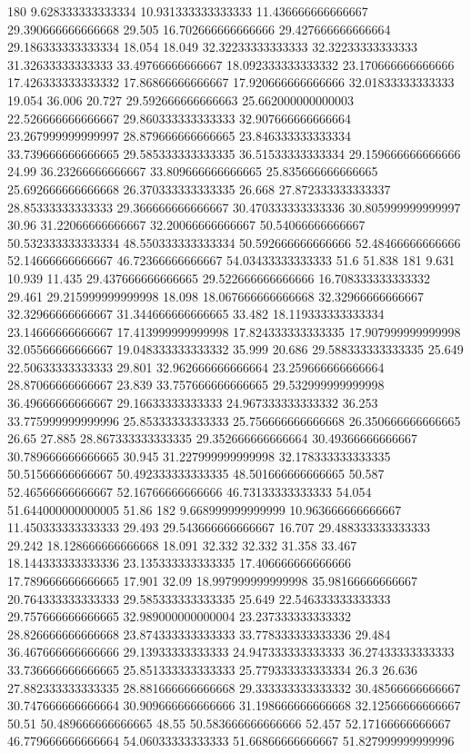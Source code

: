 180 9.628333333333334 10.931333333333333 11.436666666666667 29.390666666666668 29.505 16.702666666666666 29.427666666666664 29.186333333333334 18.054 18.049 32.32233333333333 32.32233333333333 31.32633333333333 33.49766666666667 18.092333333333332 23.170666666666666 17.426333333333332 17.86866666666667 17.920666666666666 32.01833333333333 19.054 36.006 20.727 29.592666666666663 25.662000000000003 22.526666666666667 29.860333333333333 32.907666666666664 23.267999999999997 28.879666666666665 23.846333333333334 33.739666666666665 29.585333333333335 36.51533333333334 29.159666666666666 24.99 36.23266666666667 33.809666666666665 25.835666666666665 25.692666666666668 26.370333333333335 26.668 27.872333333333337 28.85333333333333 29.366666666666667 30.470333333333336 30.805999999999997 30.96 31.22066666666667 32.20066666666667 50.54066666666667 50.532333333333334 48.550333333333334 50.592666666666666 52.48466666666666 52.14666666666667 46.72366666666667 54.03433333333333 51.6 51.838
181 9.631 10.939 11.435 29.437666666666665 29.522666666666666 16.708333333333332 29.461 29.215999999999998 18.098 18.067666666666668 32.32966666666667 32.32966666666667 31.344666666666665 33.482 18.119333333333334 23.14666666666667 17.413999999999998 17.824333333333335 17.907999999999998 32.05566666666667 19.048333333333332 35.999 20.686 29.588333333333335 25.649 22.50633333333333 29.801 32.962666666666664 23.259666666666664 28.87066666666667 23.839 33.757666666666665 29.532999999999998 36.49666666666667 29.16633333333333 24.967333333333332 36.253 33.775999999999996 25.85333333333333 25.756666666666668 26.350666666666665 26.65 27.885 28.867333333333335 29.352666666666664 30.49366666666667 30.789666666666665 30.945 31.227999999999998 32.178333333333335 50.51566666666667 50.492333333333335 48.501666666666665 50.587 52.46566666666667 52.16766666666666 46.73133333333333 54.054 51.644000000000005 51.86
182 9.668999999999999 10.963666666666667 11.450333333333333 29.493 29.543666666666667 16.707 29.488333333333333 29.242 18.128666666666668 18.091 32.332 32.332 31.358 33.467 18.144333333333336 23.135333333333335 17.406666666666666 17.789666666666665 17.901 32.09 18.997999999999998 35.98166666666667 20.764333333333333 29.585333333333335 25.649 22.546333333333333 29.757666666666665 32.989000000000004 23.237333333333332 28.826666666666668 23.874333333333333 33.778333333333336 29.484 36.467666666666666 29.13933333333333 24.947333333333333 36.27433333333333 33.736666666666665 25.851333333333333 25.779333333333334 26.3 26.636 27.882333333333335 28.881666666666668 29.333333333333332 30.48566666666667 30.747666666666664 30.909666666666666 31.198666666666668 32.12566666666667 50.51 50.489666666666665 48.55 50.583666666666666 52.457 52.17166666666667 46.779666666666664 54.06033333333333 51.66866666666667 51.827999999999996

